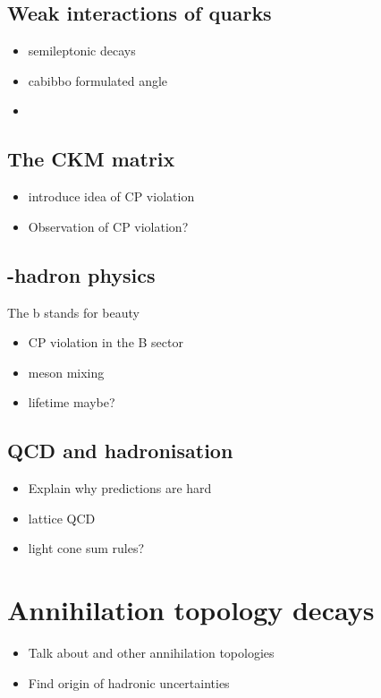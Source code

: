 \subsection{Weak interactions of quarks}

{\color{Red}
\begin{itemize}
\item semileptonic decays 
\item cabibbo formulated angle
\item  
\end{itemize}}


\subsection{The CKM matrix}

{\color{Red}
\begin{itemize}
\item introduce idea of CP violation
\item Observation of CP violation? 
\end{itemize}}

\subsection{\bquark-hadron physics}
The b stands for beauty
{\color{Red}
\begin{itemize}
\item CP violation in the B sector
\item \B meson mixing
\item lifetime maybe? 
\end{itemize}}

\subsection{QCD and hadronisation}
{\color{Red}
\begin{itemize}
\item Explain why predictions are hard
\item lattice QCD
\item light cone sum rules? 
\end{itemize}}

\section{Annihilation topology decays}

{\color{Red}
\begin{itemize}
\item Talk about \D and other annihilation topologies 
\item Find origin of hadronic uncertainties 
\end{itemize}}


